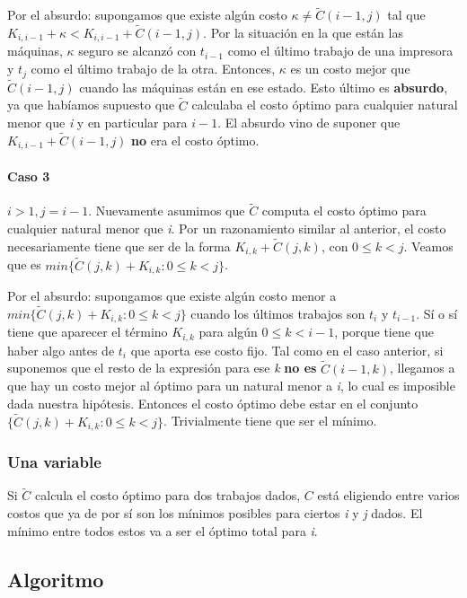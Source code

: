 \documentclass[a4paper]{report}
\begin{document}
Por el absurdo: supongamos que existe algún costo $\kappa \neq \tilde{C}(i-1,j)$ tal que $K_{i,i-1} + \kappa < K_{i,i-1} + \tilde{C}(i-1,j)$. Por la situación en la que están las máquinas, $\kappa$ seguro se alcanzó con $t_{i-1}$ como el último trabajo de una impresora y $t_{j}$ como el último trabajo de la otra. Entonces, $\kappa$ es un costo mejor que $\tilde{C}(i-1,j)$ cuando las máquinas están en ese estado. Esto último es \textbf{absurdo}, ya que habíamos supuesto que $\tilde{C}$ calculaba el costo óptimo para cualquier natural menor que \textit{i} y en particular para $i-1$. El absurdo vino de suponer que $K_{i,i-1} + \tilde{C}(i-1,j)$ \textbf{no} era el costo óptimo.

\paragraph{Caso 3} $i > 1, j = i-1$. Nuevamente asumimos que $\tilde{C}$ computa el costo óptimo para cualquier natural menor que \textit{i}. Por un razonamiento similar al anterior, el costo necesariamente tiene que ser de la forma $K_{i,k} + \tilde{C}(j,k)$, con $0 \leq k < j$. Veamos que es $min\{ \tilde{C}(j,k) + K_{i,k} : 0 \leq k < j \}$.

Por el absurdo: supongamos que existe algún costo menor a $min\{ \tilde{C}(j,k) + K_{i,k} : 0 \leq k < j \}$ cuando los últimos trabajos son $t_{i}$ y $t_{i-1}$. Sí o sí tiene que aparecer el término $K_{i,k}$ para algún $0 \leq k < i-1$, porque tiene que haber algo antes de $t_{i}$ que aporta ese costo fijo. Tal como en el caso anterior, si suponemos que el resto de la expresión para ese \textit{k} \textbf{no es} $\tilde{C}(i-1, k)$, llegamos a que hay un costo mejor al óptimo para un natural menor a \textit{i}, lo cual es imposible dada nuestra hipótesis. Entonces el costo óptimo debe estar en el conjunto $\{ \tilde{C}(j,k) + K_{i,k} : 0 \leq k < j \}$. Trivialmente tiene que ser el mínimo.

\subsubsection{Una variable}

Si $\tilde{C}$ calcula el costo óptimo para dos trabajos dados, $C$ está eligiendo entre varios costos que ya de por sí son los mínimos posibles para ciertos \textit{i} y  \textit{j} dados. El mínimo entre todos estos va a ser el óptimo total para \textit{i}.

\subsection{Algoritmo}
\end{document}

